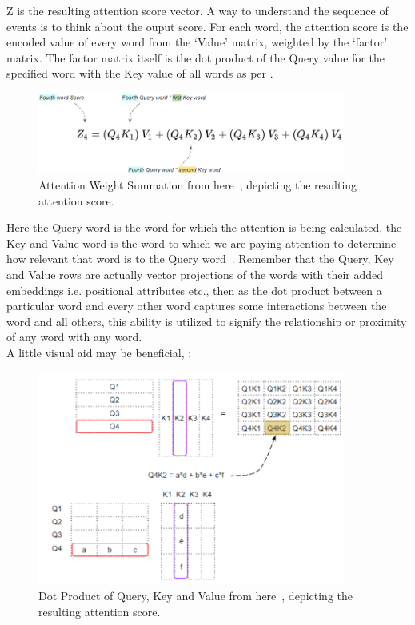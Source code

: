 Z is the resulting attention score vector. A way to understand the sequence of events is to think about the ouput score.
For each word, the attention score is the encoded value of every word from the `Value' matrix, weighted by the `factor'
matrix. The factor matrix itself is the dot product of the Query value for the specified word with the Key value of all
words as\autocite{doshiTransformersExplainedVisually2021b} per .
\begin{figure}[H]
	\centering
	\includegraphics[width=0.9\textwidth]{figures/atn_weight_summation.png}
	\caption{Attention Weight Summation from here~\autocite{doshiTransformersExplainedVisually2021b}, depicting the resulting attention score.}
	\label{fig:atn_weight_summation}
\end{figure}
Here the Query word is the word for which the attention is being calculated, the Key and Value word is the word to which we
are paying attention to determine how relevant that word is to the Query word~\autocite{doshiTransformersExplainedVisually2021b}.
\bigbreak
Remember that the Query, Key and Value rows are actually vector projections of the words with their added embeddings i.e. positional attributes etc.,
then as the dot product between a particular word and every other word captures some interactions between the word and all others, this
ability is utilized to signify the relationship or proximity of any word with any word. \\
A little visual aid may be beneficial, :
\begin{figure}[H]
	\centering
	\includegraphics[width=0.9\textwidth]{figures/dot_prod_similarity.png}
	\caption{Dot Product of Query, Key and Value from here~\autocite{doshiTransformersExplainedVisually2021b}, depicting the resulting attention score.}
	\label{fig:dot_prod_similarity}
\end{figure}
